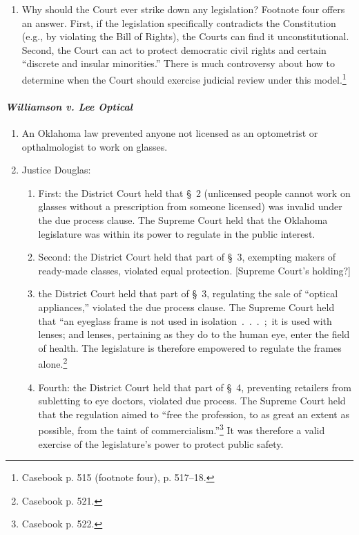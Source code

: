 \begin{enumerate}
    has little substance of its own; rather, it reflects the interests of the 
    current majority. The ``pluralist model assumes that no groups 
    persistently exercise inappropriate or unfair degrees of political power 
    in a democracy.''\footnote{Casebook p. 517.}
    \item Why should the Court ever strike down any legislation? Footnote four 
    offers an answer. First, if the legislation specifically contradicts the 
    Constitution (e.g., by violating the Bill of Rights), the Courts can find 
    it unconstitutional. Second, the Court can act to protect democratic civil 
    rights and certain ``discrete and insular minorities.'' There is much 
    controversy about how to determine when the Court should exercise judicial 
    review under this model.\footnote{Casebook p. 515 (footnote four), p. 
    517--18.}
\end{enumerate}

\paragraph{\emph{Williamson v. Lee Optical}}

\begin{enumerate}
    \item An Oklahoma law prevented anyone not licensed as an optometrist or 
    opthalmologist to work on glasses.
    \item Justice Douglas:
    \begin{enumerate}
        \item First: the District Court held that \S\ 2 (unlicensed people 
        cannot work on glasses without a prescription from someone licensed) 
        was invalid under the due process clause. The Supreme Court held that 
        the Oklahoma legislature was within its power to regulate in the 
        public interest.
        \item Second: the District Court held that part of \S\ 3, exempting 
        makers of ready-made classes, violated equal protection. [Supreme 
        Court's holding?]
        \item the District Court held that part of \S\ 3, regulating the sale 
        of ``optical appliances,'' violated the due process clause. The 
        Supreme Court held that ``an eyeglass frame is not used in 
        isolation~.~.~.~;~it is used with lenses; and lenses, pertaining as 
        they do to the human eye, enter the field of health. The legislature 
        is therefore empowered to regulate the frames alone.\footnote{Casebook 
        p. 521.}
        \item Fourth: the District Court held that part of \S\ 4, preventing 
        retailers from subletting to eye doctors, violated due process. The 
        Supreme Court held that the regulation aimed to ``free the profession, 
        to as great an extent as possible, from the taint of 
        commercialism.''\footnote{Casebook p. 522.} It was therefore a valid 
        exercise of the legislature's power to protect public safety.
    \end{enumerate}
\end{enumerate}

